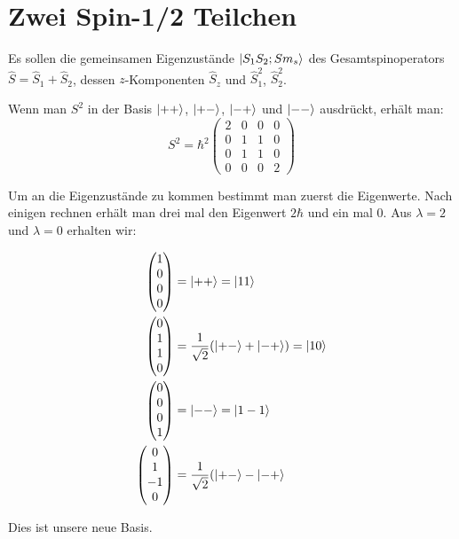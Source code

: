 \section{Zwei Spin-1/2 Teilchen}

Es sollen die gemeinsamen Eigenzustände $\left|S_1S_2;Sm_s\right\rangle$ des
Gesamtspinoperators $\hat S=\hat S_1+\hat S_2$, dessen $z$-Komponenten $\hat
S_z$ und $\hat S_1^2$, $\hat S_2^2$.

Wenn man $S^2$ in der Basis $\left|++\right\rangle$, $\left|+-\right\rangle$, $\left|-+\right\rangle$ und $\left|--\right\rangle$
ausdrückt, erhält man:
\[
    S^2 = \hbar^2 \begin{pmatrix}
        2 &0 &0 &0 \\
        0 &1 &1 &0 \\
        0 &1 &1 &0 \\
        0 &0 &0 &2
    \end{pmatrix}
\]

Um an die Eigenzustände zu kommen bestimmt man zuerst die Eigenwerte. Nach einigen rechnen erhält man drei mal den Eigenwert $2\hbar$ und ein mal 0. 
Aus $\lambda = 2$ und $\lambda = 0$ erhalten wir:

\begin{align*}
\begin{pmatrix} 1 \\ 0 \\ 0 \\ 0 \end{pmatrix} &= \left|++\right\rangle = \left|11\right\rangle \\
\begin{pmatrix} 0 \\ 1 \\ 1 \\ 0 \end{pmatrix} &= \frac{1}{\sqrt 2}(\left|+-\right\rangle+\left|-+\right\rangle) = \left|10\right\rangle \\
\begin{pmatrix} 0 \\ 0 \\ 0 \\ 1 \end{pmatrix} &= \left|--\right\rangle = \left|1-1\right\rangle \\
\begin{pmatrix} 0 \\ 1 \\ -1 \\ 0 \end{pmatrix} &=\frac 1{\sqrt 2}(\left|+-\right\rangle-\left|-+\right\rangle \\
\end{align*}

Dies ist unsere neue Basis.


